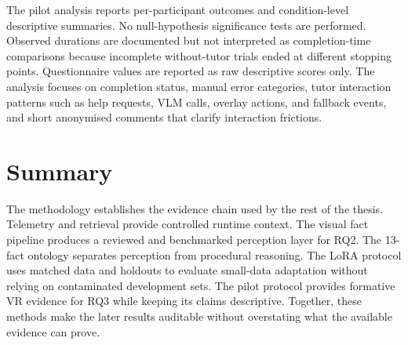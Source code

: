 The pilot analysis reports per-participant outcomes and condition-level
descriptive summaries. No null-hypothesis significance tests are performed.
Observed durations are documented but not interpreted as completion-time
comparisons because incomplete without-tutor trials ended at different stopping
points. Questionnaire values are reported as raw descriptive scores only. The
analysis focuses on completion status, manual error categories, tutor
interaction patterns such as help requests, VLM calls, overlay actions, and
fallback events, and short anonymised comments that clarify interaction
frictions.

\section{Summary}\label{sec:method-summary}

The methodology establishes the evidence chain used by the rest of the thesis.
Telemetry and retrieval provide controlled runtime context. The visual fact
pipeline produces a reviewed and benchmarked perception layer for RQ2. The
13-fact ontology separates perception from procedural reasoning. The LoRA
protocol uses matched data and holdouts to evaluate small-data adaptation
without relying on contaminated development sets. The pilot protocol provides
formative VR evidence for RQ3 while keeping its claims descriptive. Together,
these methods make the later results auditable without overstating what the
available evidence can prove.
